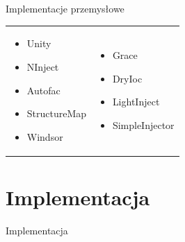 \documentclass{beamer}
\begin{document}
\begin{frame}{Implementacje przemysłowe}
\begin{table}
	\begin{tabular}{ p{5cm} p{5cm} }
	
	\begin{minipage}{.5\textwidth}
\begin{itemize}
	\item Unity
	\item NInject
	\item Autofac
	\item StructureMap
	\item Windsor
\end{itemize}
   	 \end{minipage}
   	 &
	\begin{minipage}{.5\textwidth}
\begin{itemize}
	\item Grace
	\item DryIoc
	\item LightInject
	\item SimpleInjector
\end{itemize}
   	 \end{minipage}

	\end{tabular}
\end{table}
\end{frame}


\section{Implementacja}

\begin{frame}{}
\begin{center}
\huge{Implementacja}
\end{center}
\end{frame}
\end{document}

